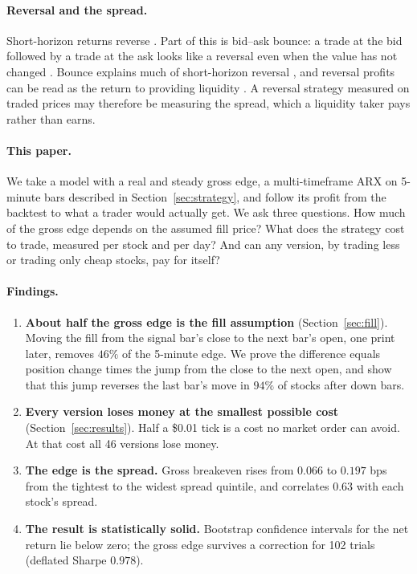 \documentclass[11pt,a4paper]{article}
\begin{document}
\paragraph{Reversal and the spread.} Short-horizon returns reverse
\citep{lehmann1990}. Part of this is bid--ask bounce: a trade at the bid followed by a trade at the ask
looks like a reversal even when the value has not changed \citep{roll1984}. Bounce explains much of
short-horizon reversal \citep{kaul1990,jegadeesh1995}, and reversal profits can be read as the return to
providing liquidity \citep{nagel2012}. A reversal strategy measured on
traded prices may therefore be measuring the spread, which a liquidity taker pays rather than earns.

\paragraph{This paper.} We take a model with a real and steady gross edge, a multi-timeframe ARX on
5-minute bars described in Section~\ref{sec:strategy}, and follow its profit from the backtest to what a
trader would actually get. We ask three questions. How much of the gross edge depends on the assumed
fill price? What does the strategy cost to trade, measured per stock and per day? And can any version,
by trading less or trading only cheap stocks, pay for itself?

\paragraph{Findings.}
\begin{enumerate}
\item \textbf{About half the gross edge is the fill assumption} (Section~\ref{sec:fill}). Moving the fill
from the signal bar's close to the next bar's open, one print later, removes $46\%$ of the 5-minute
edge. We prove the difference equals position change times the jump from the close to the next open,
and show that this jump reverses the last bar's move in $94\%$ of stocks after down bars.
\item \textbf{Every version loses money at the smallest possible cost} (Section~\ref{sec:results}). Half a
\$0.01 tick is a cost no market order can avoid. At that cost all 46 versions lose money.
\item \textbf{The edge is the spread.} Gross breakeven rises from $0.066$ to $0.197$ bps from the
tightest to the widest spread quintile, and correlates $0.63$ with each stock's spread.
\item \textbf{The result is statistically solid.} Bootstrap confidence intervals for the net return lie
below zero; the gross edge survives a correction for 102 trials (deflated Sharpe $0.978$).
\end{enumerate}
\end{document}

